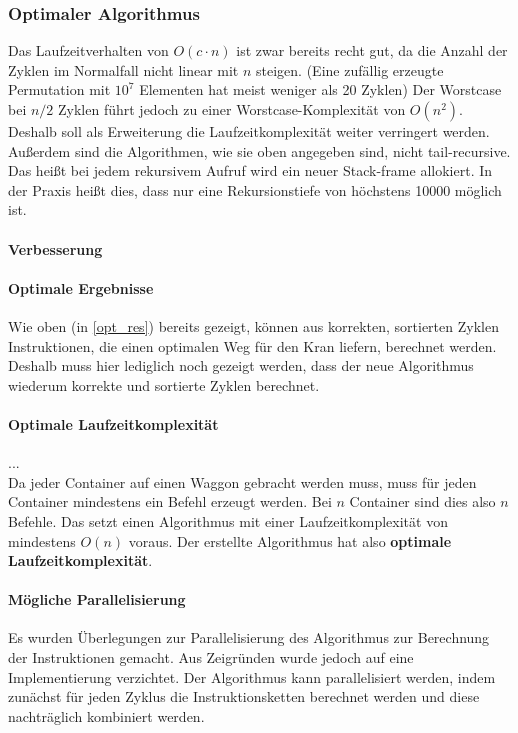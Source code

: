 \subsubsection{Optimaler Algorithmus} %
Das Laufzeitverhalten von $O(c \cdot n)$ ist zwar bereits recht gut, da die Anzahl der Zyklen im Normalfall nicht linear mit $n$ steigen.
(Eine zufällig erzeugte Permutation mit $10^7$ Elementen hat meist weniger als 20 Zyklen)%
Der Worstcase bei $n/2$ Zyklen führt jedoch zu einer Worstcase-Komplexität von $O(n^2)$. \\
Deshalb soll als Erweiterung die Laufzeitkomplexität weiter verringert werden. \\
Außerdem sind die Algorithmen, wie sie oben angegeben sind, nicht tail-recursive.
Das heißt bei jedem rekursivem Aufruf wird ein neuer Stack-frame allokiert.
In der Praxis heißt dies, dass nur eine Rekursionstiefe von höchstens 10000 möglich ist.

\paragraph{Verbesserung}
\label{fast_cycler}

\paragraph{Optimale Ergebnisse}
Wie oben (in \ref{opt_res}) bereits gezeigt, können aus korrekten, sortierten Zyklen Instruktionen, die einen optimalen Weg für den Kran liefern, berechnet werden.
Deshalb muss hier lediglich noch gezeigt werden, dass der neue Algorithmus wiederum korrekte und sortierte Zyklen berechnet. \\

\paragraph{Optimale Laufzeitkomplexität}
... \\
Da jeder Container auf einen Waggon gebracht werden muss, muss für jeden Container mindestens ein Befehl erzeugt werden.
Bei $n$ Container sind dies also $n$ Befehle. Das setzt einen Algorithmus mit einer Laufzeitkomplexität von mindestens $O(n)$ voraus.
Der erstellte Algorithmus hat also \textbf{optimale Laufzeitkomplexität}.

\paragraph{Mögliche Parallelisierung}
Es wurden Überlegungen zur Parallelisierung des Algorithmus zur Berechnung der Instruktionen gemacht.
Aus Zeigründen wurde jedoch auf eine Implementierung verzichtet.
Der Algorithmus kann parallelisiert werden,
indem zunächst für jeden Zyklus die Instruktionsketten berechnet werden und diese nachträglich kombiniert werden.

